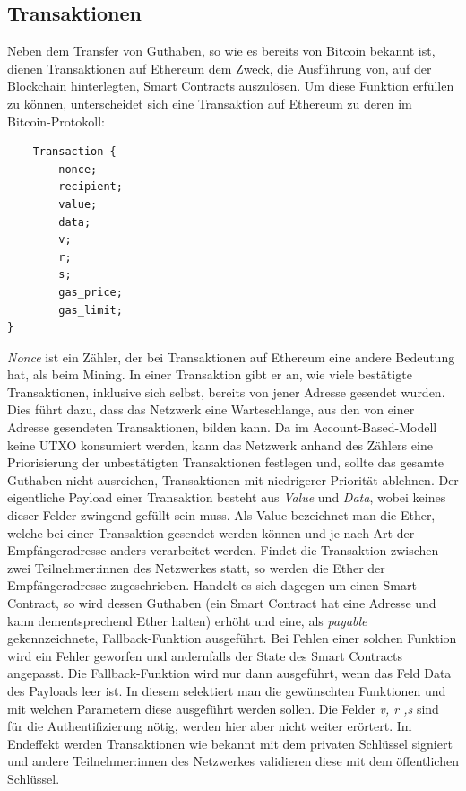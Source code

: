 \subsection{Transaktionen}
Neben dem Transfer von Guthaben, so wie es bereits von Bitcoin bekannt ist, dienen Transaktionen auf Ethereum dem Zweck, die Ausführung von, auf der Blockchain hinterlegten, Smart Contracts auszulösen.
Um diese Funktion erfüllen zu können, unterscheidet sich eine Transaktion auf Ethereum zu deren im Bitcoin-Protokoll:
\begin{lstlisting}
	Transaction {
		nonce;
		recipient;
		value;
		data;
		v;
		r;
		s;	
		gas_price;
		gas_limit;
}
\end{lstlisting}
\emph{Nonce} ist ein Zähler, der bei Transaktionen auf Ethereum eine andere Bedeutung hat, als beim Mining. In einer Transaktion gibt er an, wie viele bestätigte Transaktionen, inklusive sich selbst, bereits von jener Adresse gesendet wurden. Dies führt dazu, dass das Netzwerk eine Warteschlange, aus den von einer Adresse gesendeten Transaktionen, bilden kann. Da im Account-Based-Modell keine UTXO konsumiert werden, kann das Netzwerk anhand des Zählers eine Priorisierung der unbestätigten Transaktionen festlegen und, sollte das gesamte Guthaben nicht ausreichen, Transaktionen mit niedrigerer Priorität ablehnen.
Der eigentliche Payload einer Transaktion besteht aus \emph{Value} und \emph{Data}, wobei keines dieser Felder zwingend gefüllt sein muss.
Als Value bezeichnet man die Ether, welche bei einer Transaktion gesendet werden können und je nach Art der Empfängeradresse anders verarbeitet werden. Findet die Transaktion zwischen zwei Teilnehmer:innen des Netzwerkes statt, so werden die Ether der Empfängeradresse zugeschrieben. Handelt es sich dagegen um einen Smart Contract, so wird dessen Guthaben (ein Smart Contract hat eine Adresse und kann dementsprechend Ether halten) erhöht und eine, als \emph{payable} gekennzeichnete, Fallback-Funktion ausgeführt. Bei Fehlen einer solchen Funktion wird ein Fehler geworfen und andernfalls der State des Smart Contracts angepasst.
Die Fallback-Funktion wird nur dann ausgeführt, wenn das Feld Data des Payloads leer ist. In diesem selektiert man die gewünschten Funktionen und mit welchen Parametern diese ausgeführt werden sollen. Die Felder \emph{v, r ,s} sind für die Authentifizierung nötig, werden hier aber nicht weiter erörtert. Im Endeffekt werden Transaktionen wie bekannt mit dem privaten Schlüssel signiert und andere Teilnehmer:innen des Netzwerkes validieren diese mit dem öffentlichen Schlüssel.\\
